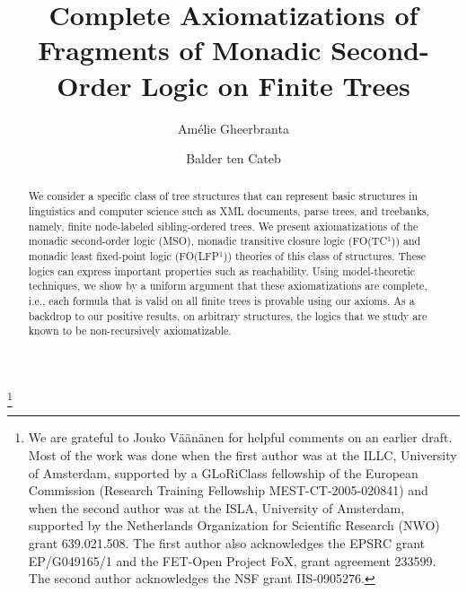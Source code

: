\documentclass{LMCS}
\newcommand{\xml}{\textsf{XML}\xspace}
\newcommand{\mso}{\textsf{MSO}\xspace}
\newcommand{\fotc}{\textsf{FO(TC$^1$)}\xspace}
\newcommand{\folfp}{\textsf{FO(LFP$^1$)}\xspace}
\begin{document}
\title[Complete Axiomatizations of Fragments of MSO on Finite Trees]{Complete Axiomatizations of Fragments of Monadic Second-Order Logic on Finite Trees}

\thanks{{}We are grateful to Jouko V\"a\"an\"anen for helpful comments on an earlier draft. Most of the work was done when the first author was at the ILLC, University of Amsterdam, supported by a GLoRiClass fellowship of the European Commission (Research Training Fellowship MEST-CT-2005-020841) and when the second author was at the ISLA, University of Amsterdam, supported by the Netherlands Organization
for Scientific Research (NWO) grant 639.021.508. The first author also
acknowledges the EPSRC grant EP/G049165/1 and the FET-Open Project FoX, grant agreement
233599. The second author
acknowledges the NSF grant IIS-0905276.}

\author[A.~Gheerbrant]{Am\'{e}lie Gheerbrant\rsuper a}
\address{{\lsuper a}School of Informatics, University of Edinburgh}

\author[B.~ten Cate]{Balder ten Cate\rsuper b}
\address{{\lsuper b}Department of Computer Science, University of
  California, Santa Cruz}

\begin{abstract}
We consider a specific class of tree structures that can 
represent basic structures in linguistics and computer science such as \xml
documents, parse trees, and treebanks, namely, finite node-labeled sibling-ordered
trees. We present axiomatizations of the monadic second-order logic (\mso),
monadic transitive closure logic (\fotc) and monadic least fixed-point logic (\folfp) theories of this class of structures. 
These logics can express important properties such as reachability. 
Using model-theoretic techniques, we show by a uniform argument that these axiomatizations are
complete, i.e., each formula that is valid on all finite trees is provable using our axioms.
As a backdrop to our positive results, on arbitrary structures, the logics that we study are known to be
non-recursively axiomatizable.
\end{abstract}


\maketitle
\end{document}
